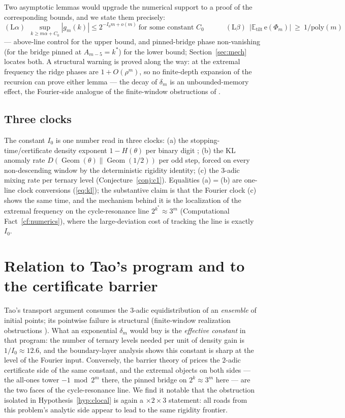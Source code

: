\documentclass[11pt]{article}
\theoremstyle{definition}
\DeclareMathOperator{\Geom}{Geom}
\newcommand{\E}{\mathbb{E}}
\newcommand{\e}{\mathrm{e}}
\begin{document}
Two asymptotic lemmas would upgrade the numerical support to a proof of
the corresponding bounds, and we state them precisely:
\[
(\mathrm{L}\alpha)\ \ \sup_{k\ge m\alpha+C_0}|g_m(k)|\le 2^{-I_0m+o(m)}\ \text{for some constant } C_0
\qquad\quad
(\mathrm{L}\beta)\ \ \bigl|\E_{\mathrm{tilt}}\,\e(\Phi_m)\bigr|\ \ge\ 1/\mathrm{poly}(m)
\]
--- above-line control for the upper bound, and pinned-bridge phase
non-vanishing (for the bridge pinned at $A_{m-5}=k^*$) for the lower
bound; Section~\ref{sec:mech} locates both. A structural warning is
proved along the way: at the extremal frequency the ridge phases are
$1+O(\rho^m)$, so no finite-depth expansion of the recursion can prove
either lemma --- the decay of $\delta_m$ is an unbounded-memory effect,
the Fourier-side analogue of the finite-window obstructions of
\cite{P1}.

\subsection*{Three clocks}
The constant $I_0$ is one number read in three clocks: (a) the
stopping-time/certificate density exponent $1-H(\theta)$ per binary
digit \cite{Terras1976,P1}; (b) the KL anomaly rate
$D(\Geom(\theta)\|\Geom(1/2))$ per odd step, forced on every
non-descending window by the deterministic rigidity identity; (c) the
$3$-adic mixing rate per ternary level (Conjecture~\ref{conj:c1}).
Equalities (a)$=$(b) are one-line clock conversions
(\eqref{eq:kl}); the substantive claim is that the Fourier clock (c)
shows the same time, and the mechanism behind it is the localization of
the extremal frequency on the cycle-resonance line
$2^{k^*}\approx 3^m$ (Computational Fact~\ref{cf:numerics}), where the
large-deviation cost of tracking the line is exactly $I_0$.

\section{Relation to Tao's program and to the certificate barrier}
\label{sec:relation}

Tao's transport argument consumes the $3$-adic equidistribution of an
\emph{ensemble} of initial points; its pointwise failure is structural
(finite-window realization obstructions \cite{P1}). What an exponential
$\delta_m$ would buy is the \emph{effective constant} in that program:
the number of ternary levels needed per unit of density gain is
$1/I_0\approx 12.6$, and the boundary-layer analysis shows this constant
is sharp at the level of the Fourier input. Conversely, the barrier
theory of \cite{P1} prices the $2$-adic certificate side of the same
constant, and the extremal objects on both sides --- the all-ones tower
$-1 \bmod 2^m$ there, the pinned bridge on $2^{k}\approx 3^m$ here ---
are the two faces of the cycle-resonance line. We find it notable that
the obstruction isolated in Hypothesis~\ref{hyp:clocal} is again a
$\times 2\times 3$ statement: all roads from this problem's analytic
side appear to lead to the same rigidity frontier.
\end{document}
